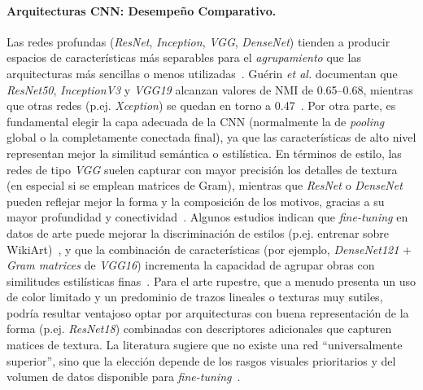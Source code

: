\paragraph{Arquitecturas CNN: Desempeño Comparativo.}
Las redes profundas (\textit{ResNet}, \textit{Inception}, \textit{VGG}, \textit{DenseNet}) tienden a producir espacios de características más separables para el \textit{agrupamiento} que las arquitecturas más sencillas o menos utilizadas~\cite{guerin2018}.
Guérin \textit{et al.} documentan que \textit{ResNet50}, \textit{InceptionV3} y \textit{VGG19} alcanzan valores de NMI de 0.65–0.68, mientras que otras redes (p.ej. \textit{Xception}) se quedan en torno a 0.47~\cite{guerin2018}.
Por otra parte, es fundamental elegir la capa adecuada de la CNN (normalmente la de \textit{pooling} global o la completamente conectada final), ya que las características de alto nivel representan mejor la similitud semántica o estilística.
En términos de estilo, las redes de tipo \textit{VGG} suelen capturar con mayor precisión los detalles de textura (en especial si se emplean matrices de Gram), mientras que \textit{ResNet} o \textit{DenseNet} pueden reflejar mejor la forma y la composición de los motivos, gracias a su mayor profundidad y conectividad~\cite{gairola2020}.
Algunos estudios indican que \textit{fine-tuning} en datos de arte puede mejorar la discriminación de estilos (p.ej. entrenar sobre WikiArt)~\cite{sanakoyeu2018}, y que la combinación de características (por ejemplo, \textit{DenseNet121} + \textit{Gram matrices} de \textit{VGG16}) incrementa la capacidad de agrupar obras con similitudes estilísticas finas~\cite{dangeti2024}.
Para el arte rupestre, que a menudo presenta un uso de color limitado y un predominio de trazos lineales o texturas muy sutiles, podría resultar ventajoso optar por arquitecturas con buena representación de la forma (p.ej. \textit{ResNet18}) combinadas con descriptores adicionales que capturen matices de textura.
La literatura sugiere que no existe una red “universalmente superior”, sino que la elección depende de los rasgos visuales prioritarios y del volumen de datos disponible para \textit{fine-tuning}~\cite{guerin2018,gairola2020}.

